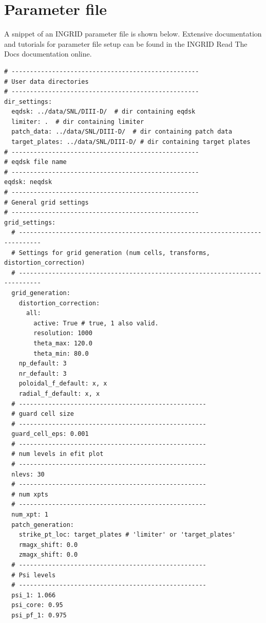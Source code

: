 \newpage
\onecolumngrid
\section{Parameter file}
A snippet of an INGRID parameter file is shown below. Extensive documentation and tutorials for parameter file setup can be found in the INGRID Read The Docs documentation online.
\begin{lstlisting}[basicstyle=\small, aboveskip=\bigskipamount, frame=single, captionpos=b, caption={Snippet of YAML formatted configuration file. YAML files utilize Python formatted comments, keyword-value mappings, and nesting of structures via indentation.}]
# ---------------------------------------------------
# User data directories
# ---------------------------------------------------
dir_settings:
  eqdsk: ../data/SNL/DIII-D/  # dir containing eqdsk
  limiter: .  # dir containing limiter
  patch_data: ../data/SNL/DIII-D/  # dir containing patch data
  target_plates: ../data/SNL/DIII-D/ # dir containing target plates
# ---------------------------------------------------
# eqdsk file name
# ---------------------------------------------------
eqdsk: neqdsk
# ---------------------------------------------------
# General grid settings
# ---------------------------------------------------
grid_settings:
  # ----------------------------------------------------------------------------
  # Settings for grid generation (num cells, transforms, distortion_correction)
  # ----------------------------------------------------------------------------
  grid_generation:
    distortion_correction:
      all:
        active: True # true, 1 also valid.
        resolution: 1000
        theta_max: 120.0
        theta_min: 80.0
    np_default: 3
    nr_default: 3
    poloidal_f_default: x, x
    radial_f_default: x, x
  # ---------------------------------------------------
  # guard cell size
  # ---------------------------------------------------
  guard_cell_eps: 0.001
  # ---------------------------------------------------
  # num levels in efit plot
  # ---------------------------------------------------
  nlevs: 30
  # ---------------------------------------------------
  # num xpts
  # ---------------------------------------------------
  num_xpt: 1
  patch_generation:
    strike_pt_loc: target_plates # 'limiter' or 'target_plates'
    rmagx_shift: 0.0
    zmagx_shift: 0.0
  # ---------------------------------------------------
  # Psi levels
  # ---------------------------------------------------
  psi_1: 1.066
  psi_core: 0.95
  psi_pf_1: 0.975

\end{lstlisting}
